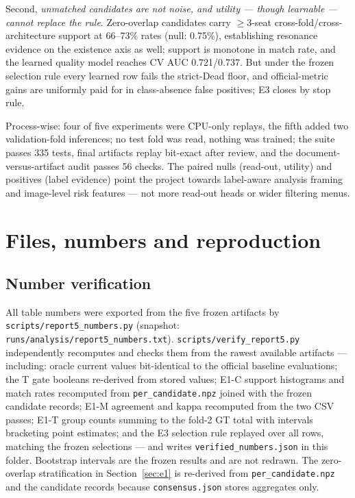 \documentclass[11pt,a4paper]{article}
\newcommand{\code}[1]{\nolinkurl{#1}}
\begin{document}
Second, \emph{unmatched candidates are not noise, and utility --- though learnable --- cannot replace the rule}. Zero-overlap candidates carry $\geq$3-seat cross-fold/cross-architecture support at 66--73\% rates (null: 0.75\%), establishing resonance evidence on the existence axis as well; support is monotone in match rate, and the learned quality model reaches CV AUC 0.721/0.737. But under the frozen selection rule every learned row fails the strict-Dead floor, and official-metric gains are uniformly paid for in class-absence false positives; E3 closes by stop rule.

Process-wise: four of five experiments were CPU-only replays, the fifth added two validation-fold inferences; no test fold was read, nothing was trained; the suite passes 335 tests, final artifacts replay bit-exact after review, and the document-versus-artifact audit passes 56 checks. The paired nulls (read-out, utility) and positives (label evidence) point the project towards label-aware analysis framing and image-level risk features --- not more read-out heads or wider filtering menus.

\appendix
\section{Files, numbers and reproduction}

\subsection{Number verification}

All table numbers were exported from the five frozen artifacts by \code{scripts/report5\_numbers.py} (snapshot: \code{runs/analysis/report5\_numbers.txt}). \code{scripts/verify\_report5.py} independently recomputes and checks them from the rawest available artifacts --- including: oracle current values bit-identical to the official baseline evaluations; the T gate booleans re-derived from stored values; E1-C support histograms and match rates recomputed from \code{per\_candidate.npz} joined with the frozen candidate records; E1-M agreement and kappa recomputed from the two CSV passes; E1-T group counts summing to the fold-2 GT total with intervals bracketing point estimates; and the E3 selection rule replayed over all rows, matching the frozen selections --- and writes \code{verified\_numbers.json} in this folder. Bootstrap intervals are the frozen results and are not redrawn. The zero-overlap stratification in Section~\ref{sec:e1} is re-derived from \code{per\_candidate.npz} and the candidate records because \code{consensus.json} stores aggregates only.
\end{document}
